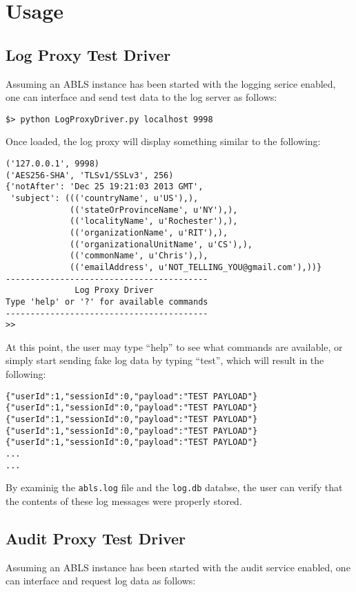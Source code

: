 \chapter{Usage}

\section{Log Proxy Test Driver}
Assuming an ABLS instance has been started with the logging serice enabled, one can interface and send test data
to the log server as follows:

\begin{lstlisting}
$> python LogProxyDriver.py localhost 9998
\end{lstlisting}

Once loaded, the log proxy will display something similar to the following:

\begin{lstlisting}
('127.0.0.1', 9998)
('AES256-SHA', 'TLSv1/SSLv3', 256)
{'notAfter': 'Dec 25 19:21:03 2013 GMT',
 'subject': ((('countryName', u'US'),),
             (('stateOrProvinceName', u'NY'),),
             (('localityName', u'Rochester'),),
             (('organizationName', u'RIT'),),
             (('organizationalUnitName', u'CS'),),
             (('commonName', u'Chris'),),
             (('emailAddress', u'NOT_TELLING_YOU@gmail.com'),))}
-----------------------------------------
              Log Proxy Driver           
Type 'help' or '?' for available commands
-----------------------------------------
>> 
\end{lstlisting}

At this point, the user may type ``help'' to see what commands are available, or simply start sending fake
log data by typing ``test'', which will result in the following:

\begin{lstlisting}
{"userId":1,"sessionId":0,"payload":"TEST PAYLOAD"}
{"userId":1,"sessionId":0,"payload":"TEST PAYLOAD"}
{"userId":1,"sessionId":0,"payload":"TEST PAYLOAD"}
{"userId":1,"sessionId":0,"payload":"TEST PAYLOAD"}
{"userId":1,"sessionId":0,"payload":"TEST PAYLOAD"}
...
...
\end{lstlisting}

By examinig the {\tt abls.log} file and the {\tt log.db} databse, the user can verify that the contents of these
log messages were properly stored.

\section{Audit Proxy Test Driver}
Assuming an ABLS instance has been started with the audit service enabled, one can interface and request log data
as follows:

